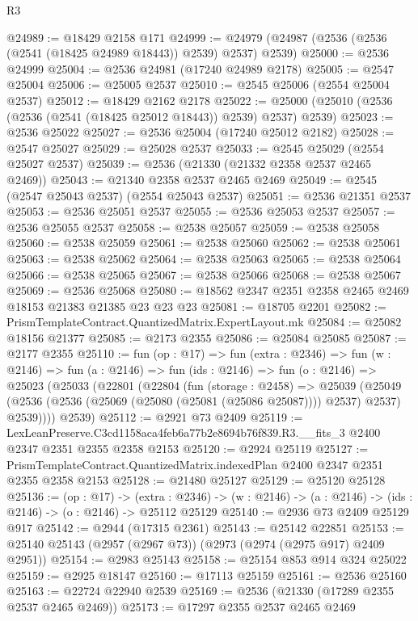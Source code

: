 \begin{lexlean}{R3}
\begin{coremodule}
@24989 := @18429 @2158 @171
@24999 := @24979 (@24987 (@2536 (@2536 (@2541 (@18425 @24989 @18443)) @2539) @2537) @2539)
@25000 := @2536 @24999
@25004 := @2536 @24981 (@17240 @24989 @2178)
@25005 := @2547 @25004
@25006 := @25005 @2537
@25010 := @2545 @25006 (@2554 @25004 @2537)
@25012 := @18429 @2162 @2178
@25022 := @25000 (@25010 (@2536 (@2536 (@2541 (@18425 @25012 @18443)) @2539) @2537) @2539)
@25023 := @2536 @25022
@25027 := @2536 @25004 (@17240 @25012 @2182)
@25028 := @2547 @25027
@25029 := @25028 @2537
@25033 := @2545 @25029 (@2554 @25027 @2537)
@25039 := @2536 (@21330 (@21332 @2358 @2537 @2465 @2469))
@25043 := @21340 @2358 @2537 @2465 @2469
@25049 := @2545 (@2547 @25043 @2537) (@2554 @25043 @2537)
@25051 := @2536 @21351 @2537
@25053 := @2536 @25051 @2537
@25055 := @2536 @25053 @2537
@25057 := @2536 @25055 @2537
@25058 := @2538 @25057
@25059 := @2538 @25058
@25060 := @2538 @25059
@25061 := @2538 @25060
@25062 := @2538 @25061
@25063 := @2538 @25062
@25064 := @2538 @25063
@25065 := @2538 @25064
@25066 := @2538 @25065
@25067 := @2538 @25066
@25068 := @2538 @25067
@25069 := @2536 @25068
@25080 := @18562 @2347 @2351 @2358 @2465 @2469 @18153 @21383 @21385 @23 @23 @23
@25081 := @18705 @2201
@25082 := PrismTemplateContract.QuantizedMatrix.ExpertLayout.mk
@25084 := @25082 @18156 @21377
@25085 := @2173 @2355
@25086 := @25084 @25085
@25087 := @2177 @2355
@25110 := fun (op : @17) =>
  fun (extra : @2346) =>
  fun (w : @2146) =>
  fun (a : @2146) =>
  fun (ids : @2146) =>
  fun (o : @2146) =>
  @25023
    (@25033
      (@22801
        (@22804
          (fun (storage : @2458) =>
          @25039
            (@25049 (@2536 (@2536 (@25069 (@25080 (@25081 (@25086 @25087)))) @2537) @2537) @2539))))
      @2539)
@25112 := @2921 @73 @2409
@25119 := LexLeanPreserve.C3cd1158aca4feb6a77b2e8694b76f839.R3.__fits_3
    @2400
    @2347
    @2351
    @2355
    @2358
    @2153
@25120 := @2924 @25119
@25127 := PrismTemplateContract.QuantizedMatrix.indexedPlan @2400 @2347 @2351 @2355 @2358 @2153
@25128 := @21480 @25127
@25129 := @25120 @25128
@25136 := (op : @17) ->
  (extra : @2346) -> (w : @2146) -> (a : @2146) -> (ids : @2146) -> (o : @2146) -> @25112 @25129
@25140 := @2936 @73 @2409 @25129 @917
@25142 := @2944 (@17315 @2361)
@25143 := @25142 @22851
@25153 := @25140 @25143 (@2957 (@2967 @73)) (@2973 (@2974 (@2975 @917) @2409 @2951))
@25154 := @2983 @25143
@25158 := @25154 @853 @914 @324 @25022
@25159 := @2925 @18147
@25160 := @17113 @25159
@25161 := @2536 @25160
@25163 := @22724 @22940 @2539
@25169 := @2536 (@21330 (@17289 @2355 @2537 @2465 @2469))
@25173 := @17297 @2355 @2537 @2465 @2469

\end{coremodule}
\end{lexlean}
